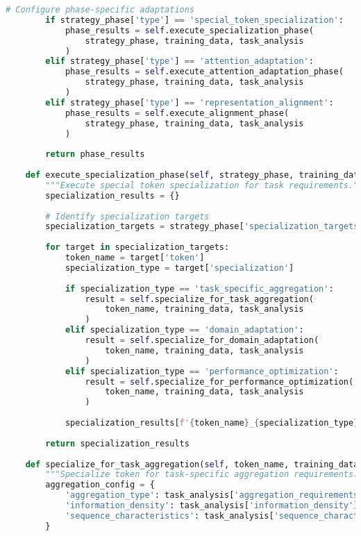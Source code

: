 \begin{lstlisting}[language=Python, caption=Function-preserving fine-tuning framework]
        # Configure phase-specific adaptations
        if strategy_phase['type'] == 'special_token_specialization':
            phase_results = self.execute_specialization_phase(
                strategy_phase, training_data, task_analysis
            )
        elif strategy_phase['type'] == 'attention_adaptation':
            phase_results = self.execute_attention_adaptation_phase(
                strategy_phase, training_data, task_analysis
            )
        elif strategy_phase['type'] == 'representation_alignment':
            phase_results = self.execute_alignment_phase(
                strategy_phase, training_data, task_analysis
            )
        
        return phase_results
    
    def execute_specialization_phase(self, strategy_phase, training_data, task_analysis):
        """Execute special token specialization for task requirements."""
        specialization_results = {}
        
        # Identify specialization targets
        specialization_targets = strategy_phase['specialization_targets']
        
        for target in specialization_targets:
            token_name = target['token']
            specialization_type = target['specialization']
            
            if specialization_type == 'task_specific_aggregation':
                result = self.specialize_for_task_aggregation(
                    token_name, training_data, task_analysis
                )
            elif specialization_type == 'domain_adaptation':
                result = self.specialize_for_domain_adaptation(
                    token_name, training_data, task_analysis
                )
            elif specialization_type == 'performance_optimization':
                result = self.specialize_for_performance_optimization(
                    token_name, training_data, task_analysis
                )
            
            specialization_results[f'{token_name}_{specialization_type}'] = result
        
        return specialization_results
    
    def specialize_for_task_aggregation(self, token_name, training_data, task_analysis):
        """Specialize token for task-specific aggregation requirements."""
        aggregation_config = {
            'aggregation_type': task_analysis['aggregation_requirements'],
            'information_density': task_analysis['information_density'],
            'sequence_characteristics': task_analysis['sequence_characteristics']
        }
        

\end{lstlisting}

